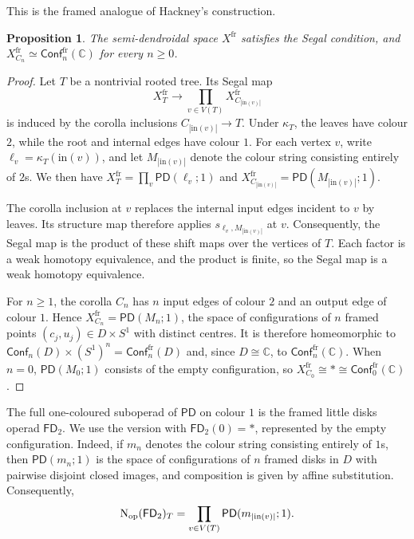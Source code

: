 \documentclass{amsart}
\newcommand{\nerve}{\textnormal{N}}
\newcommand{\Conf}{\mathsf{Conf}}%
\newtheorem{prop}[theorem]{Proposition}%
\theoremstyle{definition}
\numberwithin{equation}{section}
\begin{document}
This is the framed analogue of Hackney's construction.

\begin{prop}
\label{prop: framed configurations Segal}
The semi-dendroidal space $X^{\mathrm{fr}}$ satisfies the Segal
condition, and
$X^{\mathrm{fr}}_{C_n}\simeq
\Conf_n^{\mathrm{fr}}(\mathbb C)$ for every $n\geq0$.
\end{prop}

\begin{proof}
Let $T$ be a nontrivial rooted tree. Its Segal map
\[
X^{\mathrm{fr}}_T
\longrightarrow
\prod_{v\in V(T)}
X^{\mathrm{fr}}_{C_{|\mathrm{in}(v)|}}
\]
is induced by the corolla inclusions
$C_{|\mathrm{in}(v)|}\to T$. Under $\kappa_T$, the leaves have
colour $2$, while the root and internal edges have colour $1$. For
each vertex $v$, write
$\ell_v=\kappa_T(\mathrm{in}(v))$, and let
$M_{|\mathrm{in}(v)|}$ denote the colour string consisting entirely
of $2$s. We then have
$X^{\mathrm{fr}}_T=\prod_v\mathsf{PD}(\ell_v;1)$ and
$X^{\mathrm{fr}}_{C_{|\mathrm{in}(v)|}}
=\mathsf{PD}(M_{|\mathrm{in}(v)|};1)$.

The corolla inclusion at $v$ replaces the internal input edges
incident to $v$ by leaves. Its structure map therefore applies
$s_{\ell_v,M_{|\mathrm{in}(v)|}}$ at $v$. Consequently, the Segal
map is the product of these shift maps over the vertices of $T$.
Each factor is a weak homotopy equivalence, and the product is finite,
so the Segal map is a weak homotopy equivalence.

For $n\geq1$, the corolla $C_n$ has $n$ input edges of colour $2$
and an output edge of colour $1$. Hence
$X^{\mathrm{fr}}_{C_n}=\mathsf{PD}(M_n;1)$, the space of
configurations of $n$ framed points $(c_j,u_j)\in D\times S^1$ with
distinct centres. It is therefore homeomorphic to
$\Conf_n(D)\times(S^1)^n=\Conf_n^{\mathrm{fr}}(D)$ and, since
$D\cong\mathbb C$, to $\Conf_n^{\mathrm{fr}}(\mathbb C)$. When
$n=0$, $\mathsf{PD}(M_0;1)$ consists of the empty configuration, so
$X^{\mathrm{fr}}_{C_0}\cong*
\cong\Conf_0^{\mathrm{fr}}(\mathbb C)$.
\end{proof}

The full one-coloured suboperad of $\mathsf{PD}$ on colour $1$ is
the framed little disks operad $\mathsf{FD}_2$. We use the version
with $\mathsf{FD}_2(0)=*$, represented by the empty configuration.
Indeed, if $m_n$
denotes the colour string consisting entirely of $1$s, then
$\mathsf{PD}(m_n;1)$ is the space of configurations of $n$ framed
disks in $D$ with pairwise disjoint closed images, and composition is
given by affine substitution. Consequently,
\[
\nerve_{\mathrm{op}}(\mathsf{FD}_2)_T
=
\prod_{v\in V(T)}
\mathsf{PD}(m_{|\mathrm{in}(v)|};1).
\]
\end{document}
